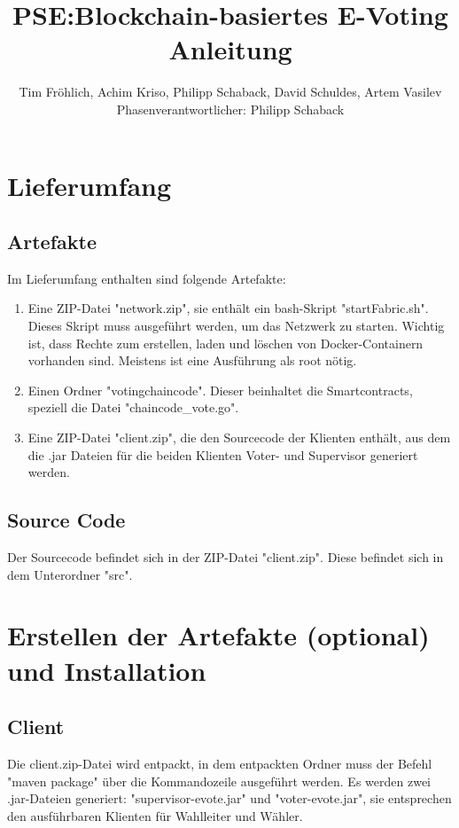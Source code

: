\documentclass[parskip=full]{scrartcl}
\title{
	PSE:Blockchain-basiertes E-Voting \\
	Anleitung
}
\author{Tim Fröhlich, Achim Kriso, Philipp Schaback, David Schuldes, Artem Vasilev\\ Phasenverantwortlicher: Philipp Schaback}
\begin{document}
	\clearpage
	\maketitle
	\newpage
	
	\tableofcontents
	\newpage
	
	\section{Lieferumfang}
	\subsection{Artefakte}
	Im Lieferumfang enthalten sind folgende Artefakte:
	\begin{enumerate}
		\item Eine ZIP-Datei "network.zip", sie enthält ein bash-Skript "startFabric.sh". Dieses Skript muss ausgeführt werden, um das Netzwerk zu starten. Wichtig ist, dass Rechte zum erstellen, laden und löschen von Docker-Containern vorhanden sind. Meistens ist eine Ausführung als root nötig.
		\item Einen Ordner "votingchaincode". Dieser beinhaltet die Smartcontracts, speziell die Datei "chaincode\_vote.go".
		\item Eine ZIP-Datei "client.zip", die den Sourcecode der Klienten enthält, aus dem die .jar Dateien für die beiden Klienten Voter- und Supervisor generiert werden.

	\end{enumerate}

	\subsection{Source Code}
	Der Sourcecode befindet sich in der ZIP-Datei "client.zip". Diese befindet sich in dem Unterordner "src".
	
	\section{Erstellen der Artefakte (optional) und Installation}
	\subsection{Client}
	Die client.zip-Datei wird entpackt, in dem entpackten Ordner muss der Befehl "maven package" über die Kommandozeile ausgeführt werden. Es werden zwei .jar-Dateien generiert: "supervisor-evote.jar" und "voter-evote.jar", sie entsprechen den ausführbaren Klienten für Wahlleiter und Wähler.
\end{document}

